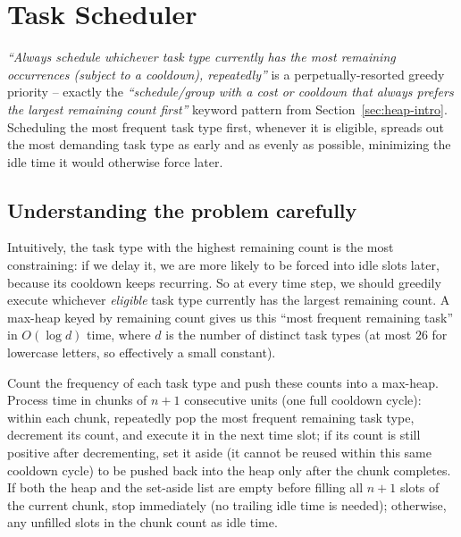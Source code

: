 \section{Task Scheduler}
\label{sec:heap-task-scheduler}


\begin{patternbox}
\emph{``Always schedule whichever task type currently has the most
remaining occurrences (subject to a cooldown), repeatedly''} is a
perpetually-resorted greedy priority -- exactly the
\emph{``schedule/group with a cost or cooldown that always prefers the
largest remaining count first''} keyword pattern from
Section~\ref{sec:heap-intro}. Scheduling the most frequent task type first,
whenever it is eligible, spreads out the most demanding task type as early
and as evenly as possible, minimizing the idle time it would otherwise
force later.
\end{patternbox}

\subsection*{Understanding the problem carefully}

Intuitively, the task type with the highest remaining count is the most
constraining: if we delay it, we are more likely to be forced into idle
slots later, because its cooldown keeps recurring. So at every time step,
we should greedily execute whichever \emph{eligible} task type currently
has the largest remaining count. A max-heap keyed by remaining count gives
us this ``most frequent remaining task'' in $O(\log d)$ time, where $d$ is
the number of distinct task types (at most $26$ for lowercase letters, so
effectively a small constant).

\begin{ideabox}
Count the frequency of each task type and push these counts into a
max-heap. Process time in chunks of $n+1$ consecutive units (one full
cooldown cycle): within each chunk, repeatedly pop the most frequent
remaining task type, decrement its count, and execute it in the next time
slot; if its count is still positive after decrementing, set it aside
(it cannot be reused within this same cooldown cycle) to be pushed back
into the heap only after the chunk completes. If both the heap and the
set-aside list are empty before filling all $n+1$ slots of the current
chunk, stop immediately (no trailing idle time is needed); otherwise, any
unfilled slots in the chunk count as idle time.
\end{ideabox}

